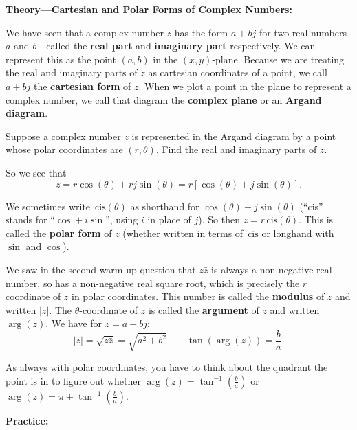 \documentclass{article}
\newcommand{\cis}{\,\mathrm{cis}}
\begin{document}
\clearpage



\textbf{Theory---Cartesian and Polar Forms of Complex Numbers:}

\vspace{5mm}

We have seen that a complex number $z$ has the form $a+bj$ for two real numbers $a$ and $b$---called the \textbf{real part} and \textbf{imaginary part} respectively. We can represent this as the point $(a,b)$ in the $(x,y)$-plane. Because we are treating the real and imaginary parts of $z$ as cartesian coordinates of a point, we call $a+bj$ the \textbf{cartesian form} of $z$. When we plot a point in the plane to represent a complex number, we call that diagram the \textbf{complex plane} or an \textbf{Argand diagram}.\medskip

Suppose a complex number $z$ is represented in the Argand diagram by a point whose polar coordinates are $(r,\theta)$. Find the real and imaginary parts of $z$.

\vfill

So we see that
\[z=r\cos(\theta)+rj\sin(\theta)=r\left[\cos(\theta)+j\sin(\theta)\right].\]

We sometimes write $\cis(\theta)$ as shorthand for $\cos(\theta)+j\sin(\theta)$ (``cis'' stands for ``$\cos+i\sin$'', using $i$ in place of $j$). So then $z=r\cis(\theta)$. This is called the \textbf{polar form} of $z$ (whether written in terms of $\cis$ or longhand with $\sin$ and $\cos$).

We saw in the second warm-up question that $z\bar{z}$ is always a non-negative real number, so has a non-negative real square root, which is precisely the $r$ coordinate of $z$ in polar coordinates. This number is called the \textbf{modulus} of $z$ and written $|z|$. The $\theta$-coordinate of $z$ is called the \textbf{argument} of $z$ and written $\arg(z)$. We have for $z=a+bj$:
\[|z|=\sqrt{z\bar{z}}=\sqrt{a^2+b^2}\qquad \tan(\arg(z))=\frac{b}{a}.\]

As always with polar coordinates, you have to think about the quadrant the point is in to figure out whether $\arg(z)=\tan^{-1}\left(\frac{b}{a}\right)$ or $\arg(z)=\pi+\tan^{-1}\left(\frac{b}{a}\right)$.











\clearpage


\textbf{Practice:}
\end{document}
